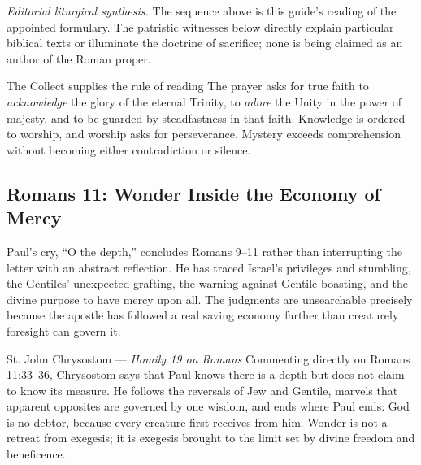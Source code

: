 \begin{deepstudy}
\noindent\emph{Editorial liturgical synthesis.} The sequence above is this guide's reading of the appointed formulary. The patristic witnesses below directly explain particular biblical texts or illuminate the doctrine of sacrifice; none is being claimed as an author of the Roman proper.

\begin{massbox}{The Collect supplies the rule of reading}
The prayer asks for true faith to \emph{acknowledge} the glory of the eternal Trinity, to \emph{adore} the Unity in the power of majesty, and to be guarded by steadfastness in that faith. Knowledge is ordered to worship, and worship asks for perseverance. Mystery exceeds comprehension without becoming either contradiction or silence.
\end{massbox}

\sectionguard
\subsection*{Romans 11: Wonder Inside the Economy of Mercy\enspace{}}

Paul's cry, ``O the depth,'' concludes Romans 9--11 rather than interrupting the letter with an abstract reflection. He has traced Israel's privileges and stumbling, the Gentiles' unexpected grafting, the warning against Gentile boasting, and the divine purpose to have mercy upon all. The judgments are unsearchable precisely because the apostle has followed a real saving economy farther than creaturely foresight can govern it.

\begin{sourcecard}{St. John Chrysostom --- \emph{Homily 19 on Romans}}
Commenting directly on Romans 11:33--36, Chrysostom says that Paul knows there is a depth but does not claim to know its measure. He follows the reversals of Jew and Gentile, marvels that apparent opposites are governed by one wisdom, and ends where Paul ends: God is no debtor, because every creature first receives from him. Wonder is not a retreat from exegesis; it is exegesis brought to the limit set by divine freedom and beneficence.
\end{sourcecard}


\end{deepstudy}
